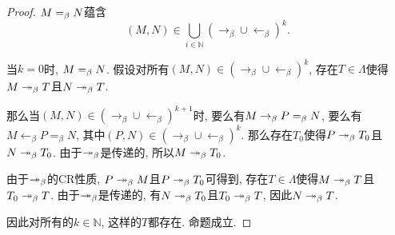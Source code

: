 \begin{proof}
    $M=_{\beta} N$蕴含
	$$(M,N)\in\bigcup_{i\in\mathbb{N}}(\to_{\beta}\cup\leftarrow_{\beta})^k.$$
	
	当$k=0$时, $M=_{\beta} N$.
	假设对所有$(M,N)\in(\to_{\beta}\cup\leftarrow_{\beta})^k$, 存在$T\in\Lambda$使得$M\twoheadrightarrow_{\beta} T$且$N\twoheadrightarrow_{\beta} T$.
	
	那么当$(M,N)\in(\to_{\beta}\cup\leftarrow_{\beta})^{k+1}$时, 要么有$M\rightarrow_{\beta} P=_\beta N$, 要么有$M\leftarrow_\beta P=_\beta N$, 其中$(P,N)\in(\to_{\beta}\cup\leftarrow_{\beta})^k$. 那么存在$T_0$使得$P\twoheadrightarrow_{\beta} T_0$且$N\twoheadrightarrow_{\beta} T_0$. 由于$\twoheadrightarrow_{\beta}$是传递的, 所以$M\twoheadrightarrow_{\beta} T_0$.
	
	由于$\twoheadrightarrow_{\beta}$的CR性质, $P\twoheadrightarrow_{\beta} M$且$P\twoheadrightarrow_{\beta} T_0$可得到, 存在$T\in\Lambda$使得$M\twoheadrightarrow_{\beta} T$且$T_0\twoheadrightarrow_{\beta} T$. 由于$\twoheadrightarrow_{\beta}$是传递的, 有$N\twoheadrightarrow_{\beta} T_0$且$T_0\twoheadrightarrow_{\beta} T$, 因此$N\twoheadrightarrow_{\beta} T$.
	
	因此对所有的$k\in\mathbb{N}$, 这样的$T$都存在. 命题成立.
\end{proof}
